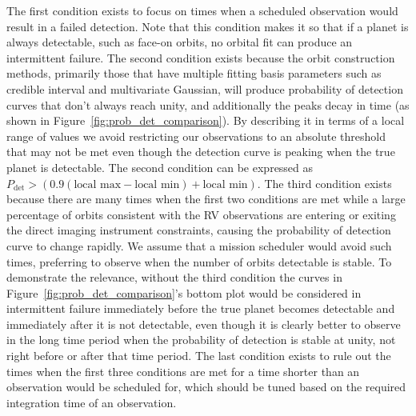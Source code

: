 The first condition exists to focus on times when a scheduled observation would result in a failed
detection. Note that this condition makes it so that if a planet is always detectable, such as
face-on orbits, no orbital fit can produce an intermittent failure.  The second condition exists
because the orbit construction methods, primarily those that have multiple fitting basis parameters
such as credible interval and multivariate Gaussian, will produce probability of detection curves
that don't always reach unity, and additionally the peaks decay in time (as shown in
Figure~\ref{fig:prob_det_comparison}). By describing it in terms of a local range of values we avoid
restricting our observations to an absolute threshold that may not be met even though the detection
curve is peaking when the true planet is detectable. The second condition can be expressed as
$P_{\textrm{det}} > \left(0.9 \left(  \textrm{local max} - \textrm{local min}\right) + \textrm{local
min}\right)$.  The third condition exists because there are many times when the first two conditions
are met while a large percentage of orbits consistent with the RV observations are entering
or exiting the direct imaging instrument constraints, causing the probability of detection curve
to change rapidly. We assume that a mission scheduler would avoid such times, preferring to
observe when the number of orbits detectable is stable.
To demonstrate the relevance, without the third condition the curves in Figure~\ref{fig:prob_det_comparison}'s
bottom plot would be considered in intermittent failure immediately before the true planet becomes
detectable and immediately after it is not detectable, even though it is clearly better to observe
in the long time period when the probability of detection is stable at unity, not right before or
after that time period. The last condition exists to rule out the times when the first three
conditions are met for a time shorter than an observation would be scheduled for, which should be
tuned based on the required integration time of an observation.

